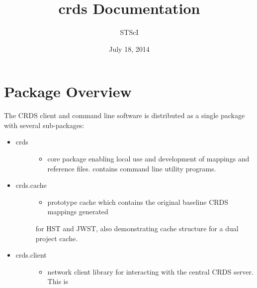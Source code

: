 \documentclass[letterpaper,10pt,english]{sphinxmanual}
\title{crds Documentation}
\date{July 18, 2014}
\author{STScI}
\begin{document}
\maketitle
\tableofcontents
{}\label{index::doc}



\chapter{Package Overview}
\label{installation:package-overview}\label{installation:crds-user-manual}\label{installation::doc}
The CRDS client and command line software is distributed as a single package with
several sub-packages:
\begin{itemize}
\item {} \begin{description}
\item[{crds}] \leavevmode\begin{itemize}
\item {} 
core package enabling local use and development of mappings
and reference files.  contains command line utility programs.

\end{itemize}

\end{description}

\item {} \begin{description}
\item[{crds.cache}] \leavevmode\begin{itemize}
\item {} 
prototype cache which contains the original baseline CRDS mappings generated

\end{itemize}

for HST and JWST,  also demonstrating cache structure for a dual project cache.

\end{description}

\item {} \begin{description}
\item[{crds.client}] \leavevmode\begin{itemize}
\item {} 
network client library for interacting with the central CRDS server.  This is

\end{itemize}


\end{description}
\end{itemize}
\end{document}
